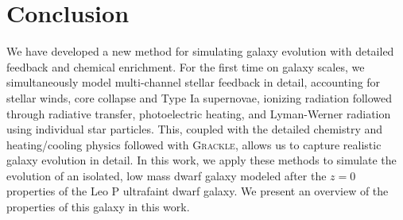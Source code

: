 \documentclass[twocolumn]{aastex61}
\begin{document}
\section{Conclusion}
\label{sec:conclusion}
We have developed a new method for simulating galaxy evolution with detailed feedback and chemical enrichment. For the first time on galaxy scales, we simultaneously model multi-channel stellar feedback in detail, accounting for stellar winds, core collapse and Type Ia supernovae, ionizing radiation followed through radiative transfer, photoelectric heating, and Lyman-Werner radiation using individual star particles. This, coupled with the detailed chemistry and heating/cooling physics followed with \textsc{Grackle}, allows us to capture realistic galaxy evolution in detail. In this work, we apply these methods to simulate the evolution of an isolated, low mass dwarf galaxy modeled after the $z=0$ properties of the Leo P ultrafaint dwarf galaxy. We present an overview of the properties of this galaxy in this work.
\end{document}
